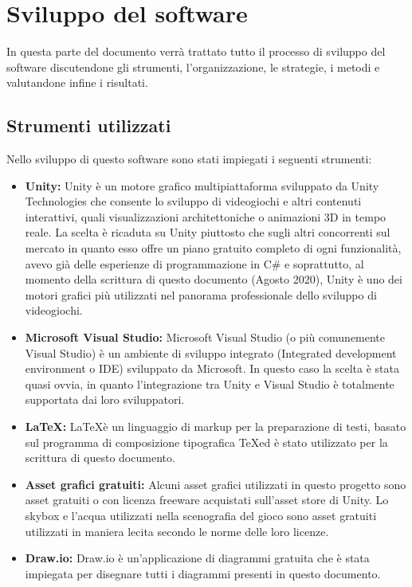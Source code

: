 \documentclass[12pt]{article}
\begin{document}
\section{Sviluppo del software}
In questa parte del documento verrà trattato tutto il processo di sviluppo del software discutendone gli strumenti, l'organizzazione, le strategie, i metodi e valutandone infine i risultati.

\subsection{Strumenti utilizzati}
Nello sviluppo di questo software sono stati impiegati i seguenti strumenti:

\begin{itemize}
\item{\textbf{Unity:}} Unity è un motore grafico multipiattaforma sviluppato da Unity Technologies che consente lo sviluppo di videogiochi e altri contenuti interattivi, quali visualizzazioni architettoniche o animazioni 3D in tempo reale. La scelta è ricaduta su Unity piuttosto che sugli altri concorrenti sul mercato in quanto esso offre un piano gratuito completo di ogni funzionalità, avevo già delle esperienze di programmazione in C\# e soprattutto, al momento della scrittura di questo documento (Agosto 2020), Unity è uno dei motori grafici più utilizzati nel panorama professionale dello sviluppo di videogiochi.
\item{\textbf{Microsoft Visual Studio:}} Microsoft Visual Studio (o più comunemente Visual Studio) è un ambiente di sviluppo integrato (Integrated development environment o IDE) sviluppato da Microsoft. In questo caso la scelta è stata quasi ovvia, in quanto l'integrazione tra Unity e Visual Studio è totalmente supportata dai loro sviluppatori.
\item{\textbf{\LaTeX:}} \LaTeX è un linguaggio di markup per la preparazione di testi, basato sul programma di composizione tipografica \TeX ed è stato utilizzato per la scrittura di questo documento.
\item{\textbf{Asset grafici gratuiti:}} Alcuni asset grafici utilizzati in questo progetto sono asset gratuiti o con licenza freeware acquistati sull'asset store di Unity. Lo skybox e l'acqua utilizzati nella scenografia del gioco sono asset gratuiti utilizzati in maniera lecita secondo le norme delle loro licenze.
\item{\textbf{Draw.io:}} Draw.io è un'applicazione di diagrammi gratuita che è stata impiegata per disegnare tutti i diagrammi presenti in questo documento.
\end{itemize}
\end{document}
